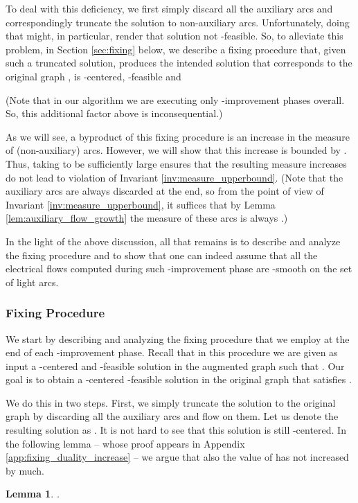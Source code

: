 \documentclass[11pt, letterpaper]{article}
\newtheorem{lemma}[theorem]{Lemma}
\begin{document}
To deal with this deficiency, we first simply discard all the auxiliary arcs and correspondingly truncate the solution  to non-auxiliary arcs. Unfortunately, doing that might, in particular, render that solution not -feasible. So, to alleviate this problem, in Section \ref{sec:fixing} below, we describe a fixing procedure that, given such a truncated solution, produces the intended solution  that corresponds to the original graph , is -centered, -feasible and

(Note that in our algorithm we are executing only  -improvement phases overall. So, this additional  factor above is inconsequential.) 

As we will see, a byproduct of this fixing procedure is an increase in the measure of (non-auxiliary) arcs. However, we will show that this increase is bounded by . Thus, taking  to be sufficiently large ensures that the resulting measure increases do not lead to violation of Invariant \ref{inv:measure_upperbound}. (Note that the auxiliary arcs are always discarded at the end, so from the point of view of Invariant \ref{inv:measure_upperbound}, it suffices that by Lemma \ref{lem:auxiliary_flow_growth} the measure of these arcs is always .)

In the light of the above discussion, all that remains is to describe and analyze the fixing procedure and to show that one can indeed assume that all the electrical flows  computed during such -improvement phase are -smooth on the set of light arcs. 


\subsubsection*{Fixing Procedure}\label{sec:fixing}
We start by describing and analyzing the fixing procedure that we employ at the end of each -improvement phase. Recall that in this procedure we are given as input a -centered and -feasible solution  in the augmented graph  such that
. Our goal is to obtain 
a -centered -feasible solution  in the original graph  that satisfies .

We do this in two steps. First, we simply truncate the solution  to the original graph  by discarding all the auxiliary arcs and flow on them. Let us denote the resulting solution as . It is not hard to see that this solution is still -centered. In the following lemma -- whose proof appears in Appendix \ref{app:fixing_duality_increase} -- we argue that also the value of  has not increased by much. 

\begin{lemma}
\label{lem:fixing_duality_increase}
.
\end{lemma}
\end{document}
